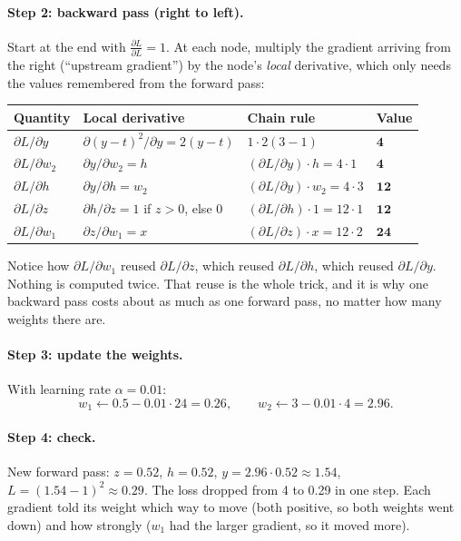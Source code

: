\documentclass[11pt,a4paper]{article}
\newcommand{\pd}[2]{\frac{\partial #1}{\partial #2}}
\begin{document}
\paragraph{Step 2: backward pass (right to left).} Start at the end with $\pd{L}{L}=1$. At each node, multiply the gradient arriving from the right (\enquote{upstream gradient}) by the node's \emph{local} derivative, which only needs the values remembered from the forward pass:
\begin{center}
\renewcommand{\arraystretch}{1.15}
\begin{tabular}{@{}l l l l@{}}
\toprule
Quantity & Local derivative & Chain rule & Value \\
\midrule
$\partial L/\partial y$ & $\partial (y-t)^2/\partial y = 2(y-t)$ & $1\cdot 2(3-1)$ & $\mathbf{4}$ \\
$\partial L/\partial w_2$ & $\partial y/\partial w_2=h$ & $(\partial L/\partial y)\cdot h = 4\cdot1$ & $\mathbf{4}$ \\
$\partial L/\partial h$ & $\partial y/\partial h=w_2$ & $(\partial L/\partial y)\cdot w_2 = 4\cdot3$ & $\mathbf{12}$ \\
$\partial L/\partial z$ & $\partial h/\partial z=1$ if $z>0$, else $0$ & $(\partial L/\partial h)\cdot1 = 12\cdot1$ & $\mathbf{12}$ \\
$\partial L/\partial w_1$ & $\partial z/\partial w_1=x$ & $(\partial L/\partial z)\cdot x = 12\cdot2$ & $\mathbf{24}$ \\
\bottomrule
\end{tabular}
\end{center}
Notice how $\partial L/\partial w_1$ reused $\partial L/\partial z$, which reused $\partial L/\partial h$, which reused $\partial L/\partial y$. Nothing is computed twice. That reuse is the whole trick, and it is why one backward pass costs about as much as one forward pass, no matter how many weights there are.

\paragraph{Step 3: update the weights.} With learning rate $\alpha=0.01$:
\[
  w_1 \gets 0.5 - 0.01\cdot24 = 0.26,\qquad w_2 \gets 3 - 0.01\cdot4 = 2.96 .
\]

\paragraph{Step 4: check.} New forward pass: $z=0.52$, $h=0.52$, $y=2.96\cdot0.52\approx1.54$, $L=(1.54-1)^2\approx\mathbf{0.29}$.
The loss dropped from 4 to 0.29 in one step. Each gradient told its weight which way to move (both positive, so both weights went down) and how strongly ($w_1$ had the larger gradient, so it moved more).
\end{document}
